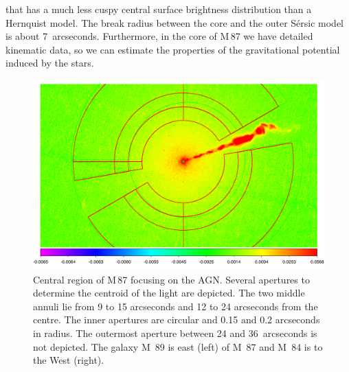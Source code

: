 \documentclass[useAMS,usenatbib]{mn2e}
\begin{document}
\citep{1968adga.book.....S,2004AJ....127.1917T} that has a much less
cuspy central surface brightness distribution than a Hernquist model.
The break radius between the core and the outer S\'ersic model is
about 7~arcseconds.  Furthermore, in the core of M\,87 we have
detailed kinematic data, so we can estimate the properties of the
gravitational potential induced by the stars.
\begin{figure}
  \includegraphics[width=\columnwidth]{ds9.pdf}
  \caption{Central region of M\,87 focusing on the AGN.  Several
    apertures to determine the centroid of the light are depicted.
    The two middle annuli lie from 9 to 15 arcseconds and 12 to 24
    arcseconds from the centre.  The inner apertures are circular and
    0.15 and 0.2 arcseconds in radius. The outermost aperture between
    24 and 36~arcseconds is not depicted.  The galaxy M~89 is east
    (left) of M~87 and M~84 is to the West (right).}
  \label{fig:M87}
\end{figure}
\end{document}
